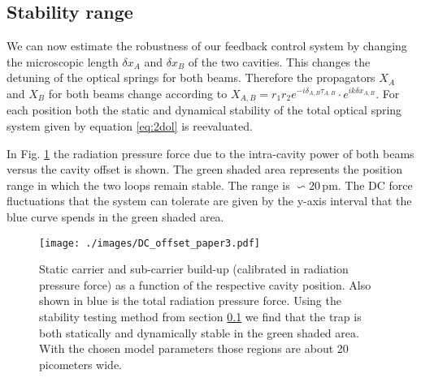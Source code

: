\documentclass[%
 reprint,
 amsmath,amssymb,
 aps,
]{revtex4-1}
\begin{document}
\subsection{Stability range}
\label{sec:stability}
%
We can now estimate the robustness of our feedback control system 
by changing the microscopic length $\delta x_A$ and $\delta x_B$ of the two cavities. This changes the detuning of the optical springs for both beams. Therefore the propagators $X_A$ and $X_B$ for both beams change according to $X_{A,B}=r_1r_2 e^{-i\delta_{A,B}\tau_{A,B}}\cdot e^{ik\delta x_{A,B}}$. For each position both the static and dynamical stability of the total optical spring system given by equation \ref{eq:2dol}
is reevaluated.

In Fig. \ref{fig:stability_region} the radiation pressure force due to the intra-cavity power of both beams
versus the cavity offset is shown. The green shaded area represents the position range in which the two loops remain stable.  The range is $\backsim 20\,$pm. 
The DC force fluctuations that the system can tolerate are given by the y-axis interval that the blue curve spends in the green shaded area. %

\begin{figure}[htbp]
	\centering
		\texttt{[image: ./images/DC\_offset\_paper3.pdf]}
	\caption{{Static carrier and sub-carrier build-up (calibrated in radiation pressure force) as a function of the respective cavity position. Also shown in blue is the total radiation pressure force. Using the stability testing method from section \ref{sec:stability} we find that the trap is both statically and dynamically stable in the green shaded area.
With the chosen model parameters those regions are about 
20 picometers wide.}}
	\label{fig:stability_region}
\end{figure}
\end{document}

